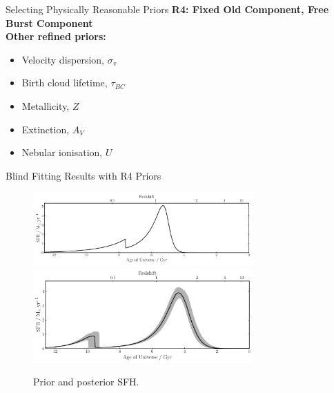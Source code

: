 \documentclass{beamer}
\begin{document}
\begin{frame}{Selecting Physically Reasonable Priors}
  \textbf{R4: Fixed Old Component, Free Burst Component} \\
  \vspace{0.5in}
  \textbf{Other refined priors:}
  \begin{center}
    \begin{itemize}
      \item Velocity dispersion, $\sigma_v$
      \item Birth cloud lifetime, $\tau_{BC}$
      \item Metallicity, $Z$
      \item Extinction, $A_V$
      \item Nebular ionisation, $U$
    \end{itemize}
  \end{center}
\end{frame}

\begin{frame}{Blind Fitting Results with R4 Priors}
  \begin{figure}
    \centering
    \includegraphics[width=0.75\textwidth]{../pipes/plots/r0_priors/phil_model_8_sfh}
    \includegraphics[width=0.75\textwidth]{../pipes/plots/r4_dblplaw_burst/phil_model_8_sfh}
    \caption{Prior and posterior SFH.}
  \end{figure}
\end{frame}
\end{document}
